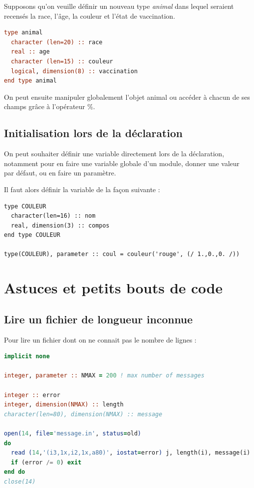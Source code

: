 \documentclass[a4paper,twoside]{article}
\begin{document}
\bigskip

\begin{exemple}
Supposons qu'on veuille définir un nouveau type \textit{animal} dans lequel seraient recensés la race, l'âge, la couleur et l'état de vaccination.
\begin{lstlisting}[language=Fortran]
type animal
  character (len=20) :: race
  real :: age
  character (len=15) :: couleur
  logical, dimension(8) :: vaccination
end type animal
\end{lstlisting}

On peut ensuite manipuler globalement l'objet animal ou accéder à chacun de ses champs grâce à l'opérateur \og \%\fg.

\end{exemple}

\subsection{Initialisation lors de la déclaration}
On peut souhaiter définir une variable directement lors de la déclaration, notamment pour en faire une variable globale d'un module, donner une valeur par défaut, ou en faire un paramètre. 

Il faut alors définir la variable de la façon suivante :
\begin{verbatim}
type COULEUR
  character(len=16) :: nom
  real, dimension(3) :: compos
end type COULEUR

type(COULEUR), parameter :: coul = couleur('rouge', (/ 1.,0.,0. /))
\end{verbatim}


\section{Astuces et petits bouts de code}
\subsection{Lire un fichier de longueur inconnue}
Pour lire un fichier dont on ne connait pas le nombre de lignes : 
\begin{lstlisting}[language=Fortran]
implicit none

integer, parameter :: NMAX = 200 ! max number of messages

integer :: error
integer, dimension(NMAX) :: length
character(len=80), dimension(NMAX) :: message

open(14, file='message.in', status=old)
do
  read (14,'(i3,1x,i2,1x,a80)', iostat=error) j, length(i), message(i)
  if (error /= 0) exit
end do
close(14)
\end{lstlisting}
\end{document}

